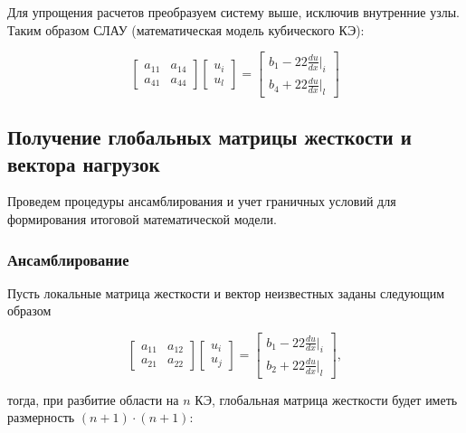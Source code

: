 Для упрощения расчетов преобразуем систему выше, исключив внутренние узлы. Таким образом СЛАУ (математическая модель кубического КЭ):

$$ \begin{bmatrix}
a_{11}     &   a_{14}\\
a_{41}     &    a_{44}
\end{bmatrix}
\begin{bmatrix}
u_i \\
u_l
\end{bmatrix} =
\begin{bmatrix}
b_1   -22  \frac{du}{dx}|_i \\
b_4   +22  \frac{du}{dx}|_l
\end{bmatrix}$$

\subsection{Получение глобальных матрицы жесткости и вектора нагрузок}

Проведем процедуры ансамблирования и учет граничных условий для формирования итоговой математической модели.

\subsubsection{Ансамблирование}

Пусть локальные матрица жесткости и вектор неизвестных заданы следующим образом

$$
\begin{bmatrix}
a_{11}     &   a_{12}\\
a_{21}     &    a_{22}
\end{bmatrix}
\begin{bmatrix}
u_i \\
u_j
\end{bmatrix} =
\begin{bmatrix}
b_1   -22  \frac{du}{dx}|_i \\
b_2   +22  \frac{du}{dx}|_l
\end{bmatrix},$$

тогда, при разбитие области на $n$ КЭ, глобальная матрица жесткости  будет иметь размерность $(n+1)\cdot(n+1)$:

